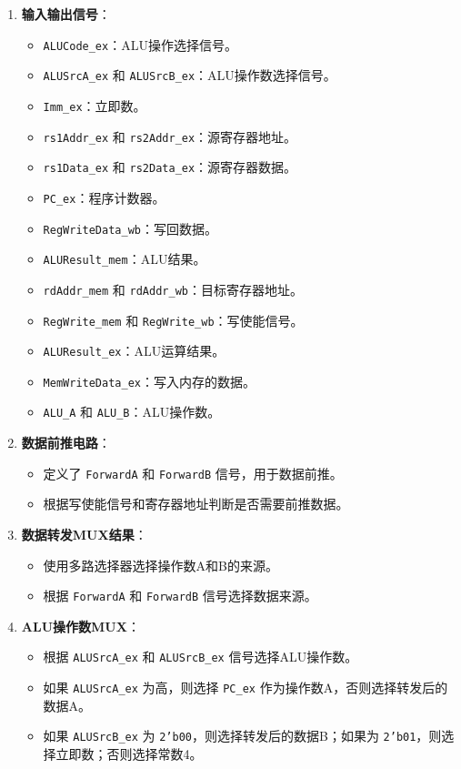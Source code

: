 \documentclass[12pt,hyperref,a4paper,UTF8]{ctexart}
\begin{document}
\begin{enumerate}
    \item \textbf{输入输出信号}：
    \begin{itemize}
        \item \texttt{ALUCode\_ex}：ALU操作选择信号。
        \item \texttt{ALUSrcA\_ex} 和 \texttt{ALUSrcB\_ex}：ALU操作数选择信号。
        \item \texttt{Imm\_ex}：立即数。
        \item \texttt{rs1Addr\_ex} 和 \texttt{rs2Addr\_ex}：源寄存器地址。
        \item \texttt{rs1Data\_ex} 和 \texttt{rs2Data\_ex}：源寄存器数据。
        \item \texttt{PC\_ex}：程序计数器。
        \item \texttt{RegWriteData\_wb}：写回数据。
        \item \texttt{ALUResult\_mem}：ALU结果。
        \item \texttt{rdAddr\_mem} 和 \texttt{rdAddr\_wb}：目标寄存器地址。
        \item \texttt{RegWrite\_mem} 和 \texttt{RegWrite\_wb}：写使能信号。
        \item \texttt{ALUResult\_ex}：ALU运算结果。
        \item \texttt{MemWriteData\_ex}：写入内存的数据。
        \item \texttt{ALU\_A} 和 \texttt{ALU\_B}：ALU操作数。
    \end{itemize}

    \item \textbf{数据前推电路}：
    \begin{itemize}
        \item 定义了 \texttt{ForwardA} 和 \texttt{ForwardB} 信号，用于数据前推。
        \item 根据写使能信号和寄存器地址判断是否需要前推数据。
    \end{itemize}

    \item \textbf{数据转发MUX结果}：
    \begin{itemize}
        \item 使用多路选择器选择操作数A和B的来源。
        \item 根据 \texttt{ForwardA} 和 \texttt{ForwardB} 信号选择数据来源。
    \end{itemize}

    \item \textbf{ALU操作数MUX}：
    \begin{itemize}
        \item 根据 \texttt{ALUSrcA\_ex} 和 \texttt{ALUSrcB\_ex} 信号选择ALU操作数。
        \item 如果 \texttt{ALUSrcA\_ex} 为高，则选择 \texttt{PC\_ex} 作为操作数A，否则选择转发后的数据A。
        \item 如果 \texttt{ALUSrcB\_ex} 为 \texttt{2'b00}，则选择转发后的数据B；如果为 \texttt{2'b01}，则选择立即数；否则选择常数4。
    \end{itemize}


\end{enumerate}
\end{document}
